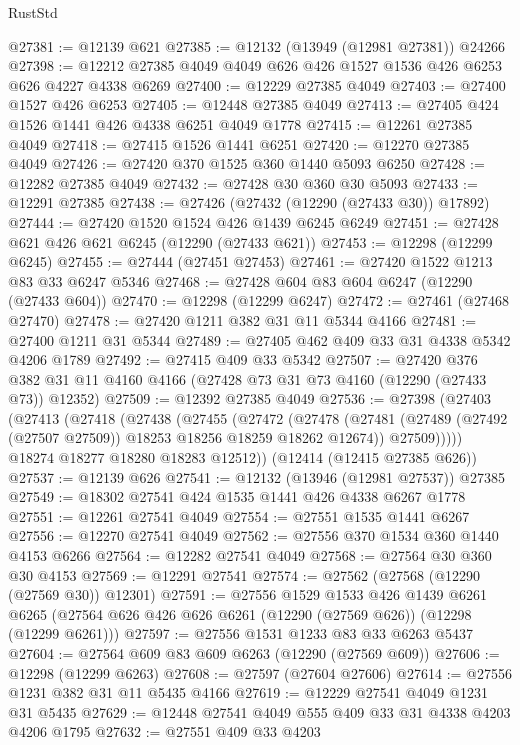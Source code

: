 \begin{lexlean}{RustStd}
\begin{coremodule}
@27381 := @12139 @621
@27385 := @12132 (@13949 (@12981 @27381)) @24266
@27398 := @12212 @27385 @4049 @4049 @626 @426 @1527 @1536 @426 @6253 @626 @4227 @4338 @6269
@27400 := @12229 @27385 @4049
@27403 := @27400 @1527 @426 @6253
@27405 := @12448 @27385 @4049
@27413 := @27405 @424 @1526 @1441 @426 @4338 @6251 @4049 @1778
@27415 := @12261 @27385 @4049
@27418 := @27415 @1526 @1441 @6251
@27420 := @12270 @27385 @4049
@27426 := @27420 @370 @1525 @360 @1440 @5093 @6250
@27428 := @12282 @27385 @4049
@27432 := @27428 @30 @360 @30 @5093
@27433 := @12291 @27385
@27438 := @27426 (@27432 (@12290 (@27433 @30)) @17892)
@27444 := @27420 @1520 @1524 @426 @1439 @6245 @6249
@27451 := @27428 @621 @426 @621 @6245 (@12290 (@27433 @621))
@27453 := @12298 (@12299 @6245)
@27455 := @27444 (@27451 @27453)
@27461 := @27420 @1522 @1213 @83 @33 @6247 @5346
@27468 := @27428 @604 @83 @604 @6247 (@12290 (@27433 @604))
@27470 := @12298 (@12299 @6247)
@27472 := @27461 (@27468 @27470)
@27478 := @27420 @1211 @382 @31 @11 @5344 @4166
@27481 := @27400 @1211 @31 @5344
@27489 := @27405 @462 @409 @33 @31 @4338 @5342 @4206 @1789
@27492 := @27415 @409 @33 @5342
@27507 := @27420
    @376
    @382
    @31
    @11
    @4160
    @4166
    (@27428 @73 @31 @73 @4160 (@12290 (@27433 @73)) @12352)
@27509 := @12392 @27385 @4049
@27536 := @27398
    (@27403
      (@27413
        (@27418
          (@27438
            (@27455
              (@27472
                (@27478
                  (@27481 (@27489 (@27492 (@27507 @27509)) @18253 @18256 @18259 @18262 @12674))
                  @27509)))))
        @18274
        @18277
        @18280
        @18283
        @12512))
    (@12414 (@12415 @27385 @626))
@27537 := @12139 @626
@27541 := @12132 (@13946 (@12981 @27537)) @27385
@27549 := @18302 @27541 @424 @1535 @1441 @426 @4338 @6267 @1778
@27551 := @12261 @27541 @4049
@27554 := @27551 @1535 @1441 @6267
@27556 := @12270 @27541 @4049
@27562 := @27556 @370 @1534 @360 @1440 @4153 @6266
@27564 := @12282 @27541 @4049
@27568 := @27564 @30 @360 @30 @4153
@27569 := @12291 @27541
@27574 := @27562 (@27568 (@12290 (@27569 @30)) @12301)
@27591 := @27556
    @1529
    @1533
    @426
    @1439
    @6261
    @6265
    (@27564 @626 @426 @626 @6261 (@12290 (@27569 @626)) (@12298 (@12299 @6261)))
@27597 := @27556 @1531 @1233 @83 @33 @6263 @5437
@27604 := @27564 @609 @83 @609 @6263 (@12290 (@27569 @609))
@27606 := @12298 (@12299 @6263)
@27608 := @27597 (@27604 @27606)
@27614 := @27556 @1231 @382 @31 @11 @5435 @4166
@27619 := @12229 @27541 @4049 @1231 @31 @5435
@27629 := @12448 @27541 @4049 @555 @409 @33 @31 @4338 @4203 @4206 @1795
@27632 := @27551 @409 @33 @4203

\end{coremodule}
\end{lexlean}
